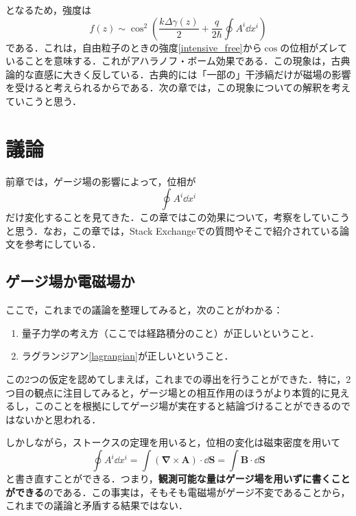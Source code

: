 \documentclass[a4paper,pdflatex,ja=standard]{bxjsarticle}
\begin{document}
となるため，強度は
\begin{equation}
  f(z)
  \sim
  \cos^2
  \left(  
    \frac{k\Delta\gamma(z)}{2}
    +
    \frac{q}{2\hbar}\oint A^{i}\dd x^{i}
  \right)
\end{equation}
である．これは，自由粒子のときの強度\eqref{intensive_free}から$\cos$の位相がズレていることを意味する．これがアハラノフ・ボーム効果である．この現象は，古典論的な直感に大きく反している．古典的には「一部の」干渉縞だけが磁場の影響を受けると考えられるからである．次の章では，この現象についての解釈を考えていこうと思う．


\section{議論}

前章では，ゲージ場の影響によって，位相が
\begin{equation}
  \oint A^{i}\dd x^{i}
  \label{phase_diff}
\end{equation}
だけ変化することを見てきた．この章ではこの効果について，考察をしていこうと思う．なお，この章では，Stack Exchangeでの質問\cite{stack1,stack2,stack3,stack4,phys_forum1}やそこで紹介されている論文\cite{Vaidman_2012,Aharonov_2015,Aharonov_2016}を参考にしている．


\subsection{ゲージ場か電磁場か}

ここで，これまでの議論を整理してみると，次のことがわかる：
\begin{enumerate}
  \item 
  量子力学の考え方（ここでは経路積分のこと）が正しいということ．
  \item 
  ラグランジアン\eqref{lagrangian}が正しいということ．
\end{enumerate}
この2つの仮定を認めてしまえば，これまでの導出を行うことができた．特に，2つ目の観点に注目してみると，ゲージ場との相互作用のほうがより本質的に見えるし，このことを根拠にしてゲージ場が実在すると結論づけることができるのではないかと思われる．

しかしながら，ストークスの定理を用いると，位相の変化は磁束密度を用いて
\begin{equation}
  \oint
  A^{i}\dd x^{i}
  =
  \int
  (\bm{\nabla}\times\bm{A})
  \cdot
  \dd\bm{S}
  =
  \int \bm{B}\cdot\dd\bm{S}
\end{equation}
と書き直すことができる．つまり，\textbf{観測可能な量はゲージ場を用いずに書くことができる}のである．この事実は，そもそも電磁場がゲージ不変であることから，これまでの議論と矛盾する結果ではない．
\end{document}
